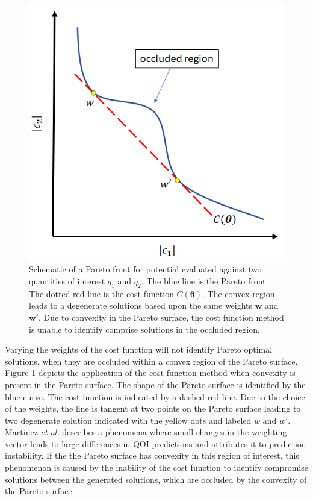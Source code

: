 \begin{figure}[htbp]
	\centering
  \includegraphics[width=5in]{chapter3/img/fig_pareto_convex}
  \caption{Schematic of a Pareto front for potential evaluated against two quantities of interest $q_1$ and $q_2$.  The blue line is the Pareto front.  The dotted red line is the cost function $C(\bm{\theta})$.  The convex region leads to a degenerate solutions based upon the same weights  $\bm{w}$ and $\bm{w}'$.  Due to convexity in the Pareto surface, the cost function method is unable to identify comprise solutions in the occluded region.}
  \label{fig:pareto_convex}
\end{figure}

Varying the weights of the cost function will not identify Pareto optimal solutions, when they are occluded within a convex region of the Pareto surface.  Figure \ref{fig:pareto_convex} depicts the application of the cost function method when convexity is present in the Pareto surface.  The shape of the Pareto surface is identified by the blue curve.  The cost function is indicated by a dashed red line.  Due to the choice of the weights, the line is tangent at two points on the Pareto surface leading to two degenerate solution indicated with the yellow dots and labeled $w$ and $w'$.  Martinez \emph{et al.}\cite{martinez2013_fitting} describes a phenomena where small changes in the weighting vector leads to large differences in QOI predictions and attributes it to prediction instability.  If the the Pareto surface has convexity in this region of interest, this phenomenon is caused by the inability of the cost function to identify compromise solutions between the generated solutions, which are occluded by the convexity of the Pareto surface.

